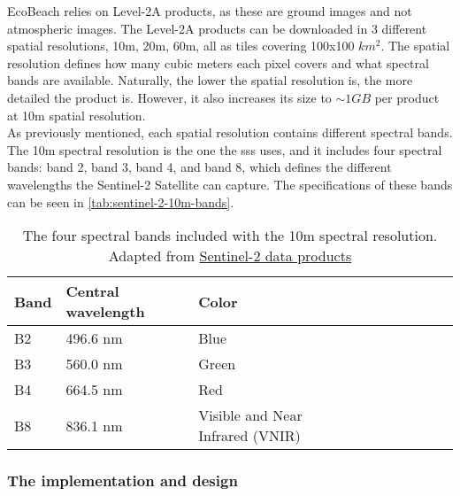 EcoBeach relies on Level-2A products, as these are ground images and not atmospheric images. The Level-2A products can be downloaded in 3 different spatial resolutions, 10m, 20m, 60m, all as tiles covering 100x100 $km^2$. The spatial resolution defines how many cubic meters each pixel covers and what spectral bands are available. Naturally, the lower the spatial resolution is, the more detailed the product is. However, it also increases its size to $\sim 1GB$ per product at 10m spatial resolution. \\

As previously mentioned, each spatial resolution contains different spectral bands. The 10m spectral resolution is the one the \acrshort{sss} uses, and it includes four spectral bands: band 2, band 3, band 4, and band 8, which defines the different wavelengths the Sentinel-2 Satellite can capture. The specifications of these bands can be seen in \autoref{tab:sentinel-2-10m-bands}.
\cite{sentinel-2-product-specification}

\begin{table}[h!]
    \centering
    \begin{tabular}{| p{0.1\linewidth} | p{0.3\linewidth} | p{0.3\linewidth} | p{0.3\linewidth} |}
        \hline
        \textbf{Band} & \textbf{Central wavelength} & \textbf{Color}                   \\ \hline
        B2            & 496.6 nm                    & Blue                             \\ \hline
        B3            & 560.0 nm                    & Green                            \\ \hline
        B4            & 664.5 nm                    & Red                              \\ \hline
        B8            & 836.1 nm                    & Visible and Near Infrared (VNIR) \\ \hline
    \end{tabular}
    \caption{The four spectral bands included with the 10m spectral resolution. Adapted from \href{https://sentinels.copernicus.eu/web/sentinel/missions/sentinel-2/data-products}{Sentinel-2 data products}}
    \label{tab:sentinel-2-10m-bands}
\end{table}

\subsubsection{The implementation and design}

